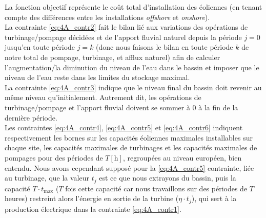 \documentclass{article}
\newcommand{\unit}[1]{[\mathrm{#1}]}
\begin{document}
La fonction objectif représente le coût total d'installation des éoliennes (en tenant compte des différences entre les installations \textit{offshore} et \textit{onshore}). \\
La contrainte \eqref{eq:4A_contr2} fait le bilan lié aux variations des opérations de 
turbinage/pompage décidées et de l'apport fluvial naturel depuis la période $j = 0$ 
jusqu'en toute période $j = k$ (donc nous faisons le bilan en toute période $k$ de notre total de pompage, turbinage, et afflux naturel) afin de calculer l'augmentation/la diminution du niveau de l'eau 
dans le bassin 
et imposer que le niveau de l'eau reste dans les limites du stockage maximal.\\
La contrainte \eqref{eq:4A_contr3} indique que le niveau final du bassin doit revenir au même niveau qu'initialement. Autrement dit, les opérations de turbinage/pompage et 
l'apport fluvial doivent se sommer à 0 à la fin de la dernière période.\\
Les contraintes \eqref{eq:4A_contr4}, \eqref{eq:4A_contr5} et \eqref{eq:4A_contr6} indiquent respectivement les bornes sur les capacités éoliennes maximales installables sur chaque site, 
les capacités maximales de turbinages et les capacités maximales de pompages pour des périodes de $T \unit{h}$, regroupées au niveau européen, bien entendu.
Nous avons cependant supposé pour la \eqref{eq:4A_contr5} contrainte, liée au turbinage, que la valeur $t_j$ est ce que 
nous extrayons du bassin, puis
la capacité $T \cdot t_\mathrm{max}$ ($T$ fois cette capacité car nous travaillons sur des périodes de $T$ heures) restreint alors l'énergie en sortie de la turbine ($\eta \cdot t_j$), qui sert à la 
production électrique dans la contrainte \eqref{eq:4A_contr1}.

\newpage %
\end{document}
